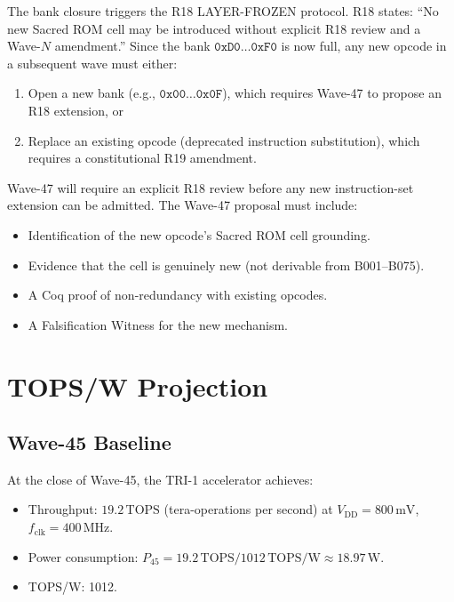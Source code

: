 The bank closure triggers the R18 LAYER-FROZEN protocol.
R18 states: ``No new Sacred ROM cell may be introduced without explicit R18
review and a Wave-$N$ amendment.''
Since the bank $\texttt{0xD0}\ldots\texttt{0xF0}$ is now full, any new opcode
in a subsequent wave must either:
\begin{enumerate}
  \item Open a new bank (e.g., $\texttt{0x00}\ldots\texttt{0x0F}$),
        which requires Wave-47 to propose an R18 extension, or
  \item Replace an existing opcode (deprecated instruction substitution),
        which requires a constitutional R19 amendment.
\end{enumerate}
Wave-47 will require an explicit R18 review before any new instruction-set
extension can be admitted.
The Wave-47 proposal must include:
\begin{itemize}
  \item Identification of the new opcode's Sacred ROM cell grounding.
  \item Evidence that the cell is genuinely new (not derivable from B001--B075).
  \item A Coq proof of non-redundancy with existing opcodes.
  \item A Falsification Witness for the new mechanism.
\end{itemize}

\section{TOPS/W Projection}
\label{sec:tops-w46}

\subsection{Wave-45 Baseline}

At the close of Wave-45, the TRI-1 accelerator achieves:
\begin{itemize}
  \item Throughput: $19.2\,\text{TOPS}$ (tera-operations per second) at
        $V_{\mathrm{DD}} = 800\,\text{mV}$, $f_{\mathrm{clk}} = 400\,\text{MHz}$.
  \item Power consumption: $P_{45} = 19.2\,\text{TOPS} / 1012\,\text{TOPS/W}
        \approx 18.97\,\text{W}$.
  \item TOPS/W: 1012.
\end{itemize}

